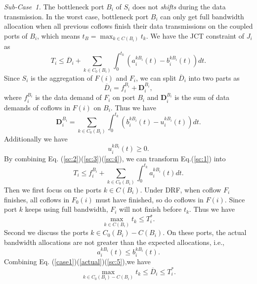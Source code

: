 \documentclass[10pt, conference, letterpaper]{IEEEtran}
\begin{document}
\begin{IEEEproof}
\emph{Sub-Case~1.} The bottleneck port $B_i$ of $S_i$ does not \emph{shifts} during the data transmission. In the worst case, bottleneck port $B_i$ can only get full bandwidth allocation when all previous coflows finish their data transmissions on the coupled ports of $B_i$, which means $t_B = \max_{k\in C(B_i)}t_k$. We have the JCT constraint of $J_i$ as
\begin{equation}\label{sc:1}
	T_i \leq \overline{D}_i + \sum_{k\in C_0(B_i)}\int_0^{t_k}(a_i^{kB_i}(t)-b_i^{kB_i}(t))dt.
\end{equation}
Since $S_i$ is the aggregation of $F(i)$ and $F_i$, we can split $\overline{D}_i$ into two parts as
\begin{equation}\label{sc:2}
	\overline{D}_i = f_i^{B_i} + \mathbf{D}_i^{B_i},
\end{equation}
where $f_i^{B_i}$ is the data demand of $F_i$ on port $B_i$ and $\mathbf{D}_i^{B_i}$ is the sum of data demands of coflows in $F(i)$ on $B_i$. Thus we have
\begin{equation}\label{sc:3}
	\mathbf{D}_i^{B_i} = \sum_{k\in C_0(B_i)}\int_0^{t_k}(b_i^{kB_i}(t)-u_i^{kB_i}(t))dt.
\end{equation}
Additionally we have 
\begin{equation}\label{sc:4}
	u_i^{kB_i}(t) \geq 0.
\end{equation}
By combining Eq. (\ref{sc:2})(\ref{sc:3})(\ref{sc:4}), we can transform Eq.(\ref{sc:1}) into
\begin{equation}\label{sc:1-0}
	T_i \leq f_i^{B_i} + \sum_{k\in C_0(B_i)}\int_0^{t_k}a_i^{kB_i}(t)dt.
\end{equation}
Then we first focus on the ports $k$$\in$$C(B_i)$. Under DRF, when coflow $F_i$ finishes, all coflows in $F_0(i)$ must have finished, so do coflows in $F(i)$. Since port $k$ keeps using full bandwidth, $F_i$ will not finish before $t_k$. Thus we have
\begin{equation}\label{sc:1-1}
	\max_{k\in C(B_i)}t_k \leq T_i^*.
\end{equation}
Second we discuss the ports $k$$\in$$C_0(B_i)-C(B_i)$. On these ports, the actual bandwidth allocations are not greater than the expected allocations, i.e.,
\begin{equation}\label{sc:5}
	a_i^{kB_i}(t)\leq b_i^{kB_i}(t).
\end{equation}
Combining Eq. (\ref{case1})(\ref{actual})(\ref{sc:5}),we have
\begin{equation}\label{sc:1-2}
	\max_{k \in C_0(B_i)-C(B_i)} t_k \leq \overline{D}_i \leq T_i^*.

\end{equation}
\end{IEEEproof}
\end{document}
